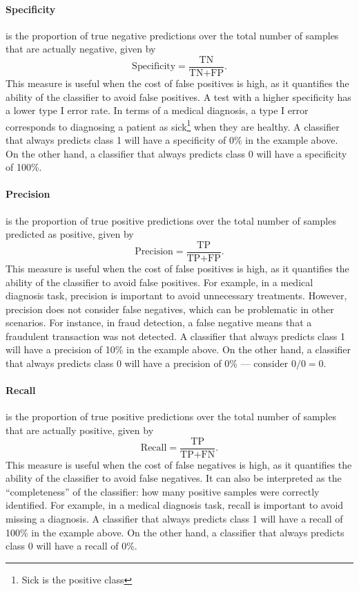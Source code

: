 \paragraph{Specificity} is the proportion of true negative predictions over the total
number of samples that are actually negative, given by
\begin{equation*}
  \text{Specificity} = \frac{\text{TN}}{\text{TN} + \text{FP}}\text{.}
\end{equation*}
This measure is useful when the cost of false positives is high, as it quantifies the
ability of the classifier to avoid false positives.  A test with a higher specificity has
a lower type I error rate.  In terms of a medical diagnosis, a type I error corresponds to
diagnosing a patient as sick\footnote{Sick is the positive class} when they are healthy.
A classifier that always predicts class 1 will have a specificity of 0\% in the example
above.  On the other hand, a classifier that always predicts class 0 will have a specificity
of 100\%.

\paragraph{Precision} is the proportion of true positive predictions over the total number
of samples predicted as positive, given by
\begin{equation*}
  \text{Precision} = \frac{\text{TP}}{\text{TP} + \text{FP}}\text{.}
\end{equation*}
This measure is useful when the cost of false positives is high, as it quantifies the
ability of the classifier to avoid false positives.  For example, in a medical diagnosis
task, precision is important to avoid unnecessary treatments.  However, precision does not
consider false negatives, which can be problematic in other scenarios.  For instance, in
fraud detection, a false negative means that a fraudulent transaction was not detected.
A classifier that always predicts class 1 will have a precision of 10\% in the example
above.  On the other hand, a classifier that always predicts class 0 will have a precision
of 0\% --- consider $0/0 = 0$.

\paragraph{Recall} is the proportion of true positive predictions over the total number of
samples that are actually positive, given by
\begin{equation*}
  \text{Recall} = \frac{\text{TP}}{\text{TP} + \text{FN}}\text{.}
\end{equation*}
This measure is useful when the cost of false negatives is high, as it quantifies the
ability of the classifier to avoid false negatives.  It can also be interpreted as the
``completeness'' of the classifier: how many positive samples were correctly identified.
For example, in a medical diagnosis task, recall is important to avoid missing a
diagnosis.  A classifier that always predicts class 1 will have a recall of 100\% in the
example above.  On the other hand, a classifier that always predicts class 0 will have a
recall of 0\%.

